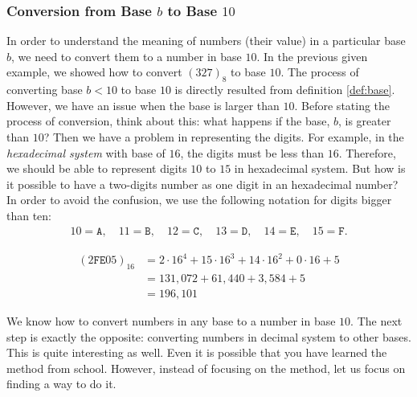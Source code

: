 \documentclass{subfile}
\begin{document}
	\subsubsection{Conversion from Base $b$ to Base $10$}
	In order to understand the meaning of numbers (their value) in a particular base $b$, we need to convert them to a number in base $10$. In the previous given example, we showed how to convert $(327)_8$ to base $10$. The process of converting base $b<10$ to base $10$ is directly resulted from definition \eqref{def:base}. However, we have an issue when the base is larger than $10$. Before stating the process of conversion, think about this: what happens if the base, $b$, is greater than $10$? Then we have a problem in representing the digits. For example, in the \textit{hexadecimal system} with base of $16$, the digits must be less than $16$. Therefore, we should be able to represent digits $10$ to $15$ in hexadecimal system. But how is it possible to have a two-digits number as one digit in an hexadecimal number? In order to avoid the confusion, we use the following notation for digits bigger than ten:
	\begin{align*}
		10 = \mathtt{A}, \quad 11 = \mathtt{B}, \quad 12 = \mathtt{C}, \quad 13 = \mathtt{D}, \quad 14 = \mathtt{E}, \quad 15 = \mathtt{F}.
	\end{align*}

	\begin{example}
		\begin{align*}
			(2\mathtt{F}\mathtt{E}05)_{16} & = 2 \cdot 16^4 + 15 \cdot 16^3 + 14 \cdot 16^2 + 0 \cdot 16 + 5 \\
			& = 131,072 + 61,440 + 3,584 + 5\\
			& = 196,101
		\end{align*}
	\end{example}
	We know how to convert numbers in any base to a number in base $10$. The next step is exactly the opposite: converting numbers in decimal system to other bases. This is quite interesting as well. Even it is possible that you have learned the method from school. However, instead of focusing on the method, let us focus on finding a way to do it.
\end{document}
